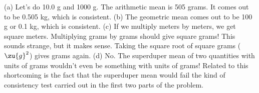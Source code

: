 (a) Let's do 10.0 g and 1000 g. The arithmetic mean
is 505 grams. It comes out to be 0.505 kg, which is
consistent. (b) The geometric mean comes out to be 100 g
or 0.1 kg, which is consistent. (c) If we multiply meters by
meters, we get square meters. Multiplying grams by grams
should give square grams! This sounds strange, but it makes
sense. Taking the square root of square grams ($\zu{g}^2$) gives
grams again. (d) No. The superduper mean of two quantities
with units of grams wouldn't even be something with units of
grams! Related to this shortcoming is the fact that the
superduper mean would fail the kind of consistency test
carried out in the first two parts of the problem.




